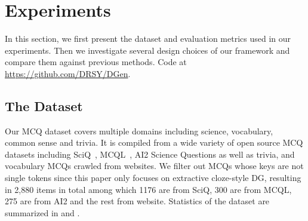 \section{Experiments}
\label{sec:experiment}
In this section, we first present the dataset and evaluation metrics used in our experiments. Then we investigate several design choices of our framework 
and compare them against previous methods. Code at \url{https://github.com/DRSY/DGen}.

\subsection{The Dataset}
\label{sec:data}

Our MCQ dataset covers multiple domains including science,  
vocabulary, common sense and trivia.
It is compiled from a wide variety of open source  
MCQ datasets including SciQ~\cite{welbl2017crowdsourcing}, 
MCQL~\cite{liang2018distractor}, AI2 Science Questions as well as trivia, and 
vocabulary MCQs crawled from websites. 
We filter out MCQs whose keys are not single tokens since this paper only 
focuses on extractive cloze-style DG, resulting in 2,880 items in total among which 1176 are from SciQ, 300 are from MCQL, 275 are from AI2 and the rest from website.
Statistics of the dataset are summarized in  and .



